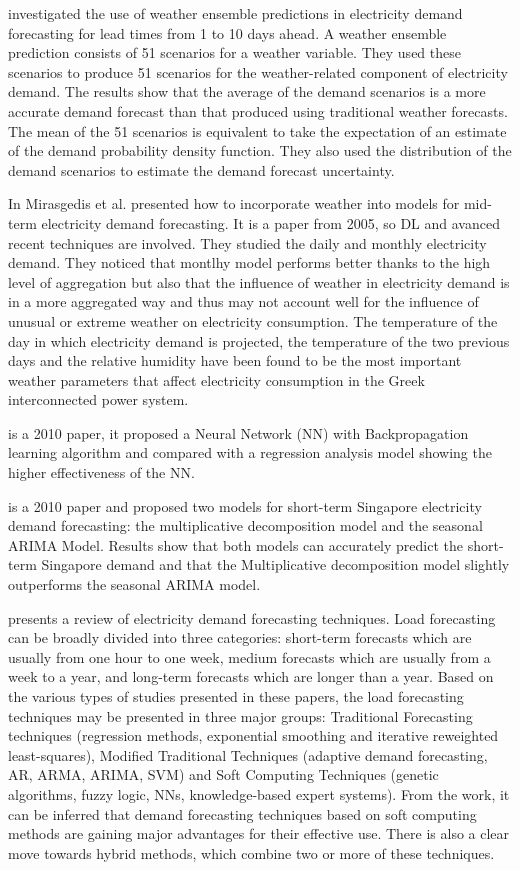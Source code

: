 \cite{TAYLOR200357} investigated the use of weather ensemble predictions in electricity demand forecasting for lead times from 1 to 10 days ahead.
A weather ensemble prediction consists of 51 scenarios for a weather variable.
They used these scenarios to produce 51 scenarios for the weather-related component of electricity demand.
The results show that the average of the demand scenarios is a more accurate demand forecast than that produced using traditional weather forecasts.
The mean of the 51 scenarios is equivalent to take the expectation of an estimate of the demand probability density function.
They also used the distribution of the demand scenarios to estimate the demand forecast uncertainty.

In \cite{MIRASGEDIS2006208} Mirasgedis et al. presented how to incorporate weather into models for mid-term electricity demand forecasting.
It is a paper from 2005, so DL and avanced recent techniques are involved.
They studied the daily and monthly electricity demand.
They noticed that montlhy model performs better thanks to the high level of aggregation but also that the influence of weather in electricity demand is in a more aggregated way and thus may not account well for the influence of unusual or extreme weather on electricity consumption.
The temperature of the day in which electricity demand is projected, the temperature of the two previous days and the relative humidity have been found to be the most important weather parameters that affect electricity consumption in the Greek interconnected power system.

\cite{5686767} is a 2010 paper, it proposed a Neural Network (NN) with Backpropagation learning algorithm and compared with a regression analysis model showing the higher effectiveness of the NN.

\cite{5518553} is a 2010 paper and proposed two models for short-term Singapore electricity demand forecasting: the multiplicative decomposition model and the seasonal ARIMA Model.
Results show that both models can accurately predict the short-term Singapore demand and that the Multiplicative decomposition model slightly outperforms the seasonal ARIMA model.

\cite{singh2013overview} presents a review of electricity demand forecasting techniques.
Load forecasting can be broadly divided into three categories:
short-term forecasts which are usually from one hour to one week,
medium forecasts which are usually from a week to a year,
and long-term forecasts which are longer than a year.
Based on the various types of studies presented in these papers, the load forecasting techniques may be presented in three major groups: Traditional Forecasting techniques (regression methods, exponential smoothing and iterative reweighted least-squares), Modified Traditional Techniques (adaptive demand forecasting, AR, ARMA, ARIMA, SVM) and Soft Computing Techniques (genetic algorithms, fuzzy logic, NNs, knowledge-based expert systems).
From the work, it can be inferred that demand forecasting techniques based on soft computing methods are gaining major advantages for their effective use.
There is also a clear move towards hybrid methods, which combine two or more of these techniques.

